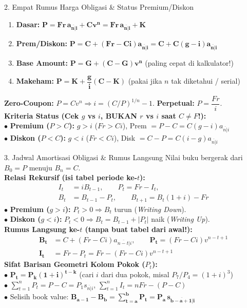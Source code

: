 \documentclass[10pt,a4paper,twocolumn]{article}
\newcommand{\angl}[1]{\overline{#1|}}
\begin{document}
\begin{cbox}{2. Empat Rumus Harga Obligasi \& Status Premium/Diskon}
\begin{enumerate}[leftmargin=3.5mm, topsep=0.5pt, itemsep=1.2pt]
    \item \textbf{Dasar:} $\mathbf{P = Fr\,a_{\angl{n}i} + C v^n = Fr\,a_{\angl{n}i} + K}$
    \item \textbf{Prem/Diskon:} $\mathbf{P = C + (Fr - Ci)a_{\angl{n}i} = C + C(g - i)a_{\angl{n}i}}$
    \item \textbf{Base Amount:} $\mathbf{P = G + (C - G)v^n}$ \quad (paling cepat di kalkulator!)
    \item \textbf{Makeham:} $\mathbf{P = K + \dfrac{g}{i}(C - K)}$ \quad (pakai jika $n$ tak diketahui / serial)
\end{enumerate}
\textbf{Zero-Coupon:} $P = Cv^n \Rightarrow i = (C/P)^{1/n} - 1$. \quad \textbf{Perpetual:} $P = \dfrac{Fr}{i}$.\\[1.2pt]
\textbf{Kriteria Status (Cek $g$ vs $i$, BUKAN $r$ vs $i$ saat $C \neq F$!):}\\
$\bullet$ \textbf{Premium ($P > C$):} $g > i$ ($Fr > Ci$), \quad Prem $= P - C = C(g - i)a_{\angl{n}i}$\\
$\bullet$ \textbf{Diskon ($P < C$):} $g < i$ ($Fr < Ci$), \quad Disk $= C - P = C(i - g)a_{\angl{n}i}$
\end{cbox}

\begin{gbox}{3. Jadwal Amortisasi Obligasi \& Rumus Langsung}
Nilai buku bergerak dari $B_0 = P$ menuju $B_n = C$.\\[1pt]
\textbf{Relasi Rekursif (isi tabel periode ke-$t$):}
\begin{align*}
    I_t &= i B_{t-1}, \qquad P_t = Fr - I_t, \\
    B_t &= B_{t-1} - P_t, \qquad B_{t+1} = B_t(1+i) - Fr
\end{align*}
$\bullet$ \textbf{Premium ($g > i$):} $P_t > 0 \Rightarrow B_t$ turun (\textit{Writing Down}).\\
$\bullet$ \textbf{Diskon ($g < i$):} $P_t < 0 \Rightarrow B_t = B_{t-1} + |P_t|$ naik (\textit{Writing Up}).\\[1.2pt]
\textbf{Rumus Langsung ke-$t$ (tanpa buat tabel dari awal!):}
\begin{align*}
    \mathbf{B_t} &= C + (Fr - Ci)a_{\angl{n-t}i}, \qquad \mathbf{P_t} = (Fr - Ci)v^{n-t+1} \\
    \mathbf{I_t} &= Fr - P_t = Fr - (Fr - Ci)v^{n-t+1}
\end{align*}
\textbf{Sifat Barisan Geometri Kolom Pokok ($P_t$):}\\
$\bullet$ $\mathbf{P_t = P_k(1+i)^{t-k}}$ \quad(cari $i$ dari dua pokok, misal $P_7/P_4 = (1+i)^3$)\\
$\bullet$ $\sum_{t=1}^n P_t = P - C = P_1 s_{\angl{n}i}$, \qquad $\sum_{t=1}^n I_t = nFr - (P - C)$\\
$\bullet$ Selisih book value: $\mathbf{B_{a-1} - B_b = \sum_{t=a}^b P_t = P_a \, s_{\angl{b-a+1}i}}$
\end{gbox}
\end{document}
